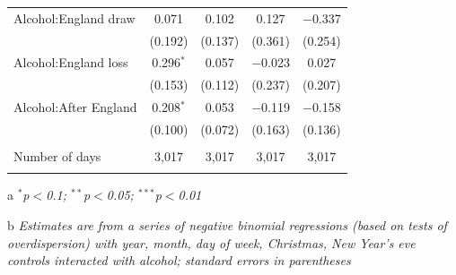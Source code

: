 \documentclass[12pt, letterpaper]{article}
\begin{document}
\begin{table}[htp]
{\begin{threeparttable}
\begin{tabular}{@{\extracolsep{5pt}}lcccc}
  Alcohol:England draw & 0.071 & 0.102 & 0.127 & $-$0.337 \\ 
  & (0.192) & (0.137) & (0.361) & (0.254) \\ 
  Alcohol:England loss & 0.296$^{*}$ & 0.057 & $-$0.023 & 0.027 \\ 
  & (0.153) & (0.112) & (0.237) & (0.207) \\ 
  Alcohol:After England & 0.208$^{*}$ & 0.053 & $-$0.119 & $-$0.158 \\ 
  & (0.100) & (0.072) & (0.163) & (0.136) \\ 
 \hline \\[-1.8ex] 
Number of days & 3,017 & 3,017 & 3,017 & 3,017 \\ 
\hline 
\hline \\[-1.8ex] 
\end{tabular} 
\begin{tablenotes}
     \item[a] \textit{$^{*}$p$<$0.1; $^{**}$p$<$0.05; $^{***}$p$<$0.01}
      \item[b] \textit{Estimates are from a series of negative binomial regressions (based on tests of overdispersion)  with year, month, day of week, Christmas, New Year's eve controls interacted with alcohol; standard errors in parentheses}
    \end{tablenotes}
\end{threeparttable} }
\end{table}

\newpage
\end{document}
